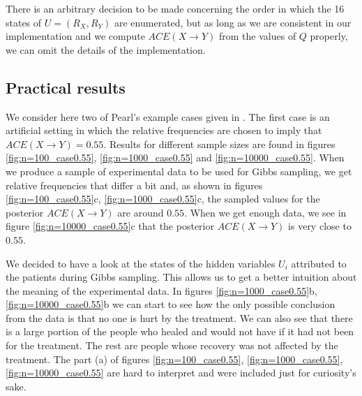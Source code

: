 \documentclass[a4paper, 10pt]{article}
\begin{document}
There is an arbitrary
decision to be made concerning the order in which the 16 states of $U=(R_X,
R_Y)$ are enumerated, but as long as we are consistent in our implementation
and we compute $ACE(X\rightarrow Y)$ from the values of $Q$ properly, we can
omit the details of the implementation.

\subsection{Practical results}

We consider here two of Pearl's example cases given in \cite{pearl2000cmr}. The
first case is an artificial setting
in which the relative frequencies are chosen to imply that
\mbox{$ACE(X\rightarrow
Y)=0.55$}. Results for different sample sizes are found in figures
\ref{fig:n=100_case0.55}, \ref{fig:n=1000_case0.55} and
\ref{fig:n=10000_case0.55}. When we produce a sample of experimental data to be
used for Gibbs
sampling, we get relative frequencies that differ a bit and, as shown in
figures \ref{fig:n=100_case0.55}c, \ref{fig:n=1000_case0.55}c, the sampled
values for the posterior $ACE(X\rightarrow Y)$ are around $0.55$. When we get
enough data, we see in figure \ref{fig:n=10000_case0.55}c that the posterior
$ACE(X\rightarrow Y)$ is very close to $0.55$.

We decided to have a look at the states of the hidden variables $U_i$
attributed to the patients during Gibbs sampling. This allows us to get a better
intuition
about the meaning of the experimental data. In figures
\ref{fig:n=1000_case0.55}b, \ref{fig:n=10000_case0.55}b we can start to see how
the only possible conclusion from the data is that no one is hurt by the
treatment. We can also see that there is a large portion of the people who
healed and would not have if it had not been for the treatment. The rest are
people whose recovery was not affected by the treatment. The part (a) of
figures \ref{fig:n=100_case0.55}, \ref{fig:n=1000_case0.55},
\ref{fig:n=10000_case0.55} are hard to interpret and were included just for
curiosity's sake.
\end{document}
